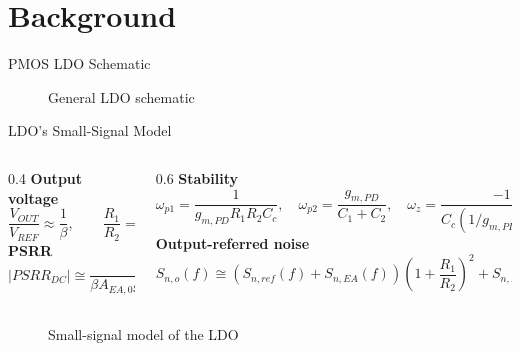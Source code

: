 \documentclass[10pt, aspectratio=169]{beamer}
\newcommand{\svg}[3]{
    \begin{figure}
        \centering
        
        \caption{#2}
    \end{figure}
}
\begin{document}
\section{Background}
\begin{frame}{PMOS LDO Schematic}
    \svg{../images/pmos_ldo.svg}{General LDO schematic}{1}
\end{frame}
\begin{frame}{LDO's Small-Signal Model}
    \begin{columns}[T,onlytextwidth]
        \begin{column}{0.4\textwidth}
            \small
            \textbf{Output voltage}
            \begin{equation*}
                \frac{V_{OUT}}{V_{REF}} \approx \frac{1}{\beta},
                \qquad
                \frac{R_1}{R_2} = \frac{V_{REF}}{V_{OUT}} - 1
            \end{equation*}
            \textbf{PSRR}
            \begin{equation*}
                |PSRR_{DC}| \cong
                \frac{1}{\beta A_{EA,0}g_{m,PD}r_{ds,p}}
            \end{equation*}
        \end{column}
        \begin{column}{0.6\textwidth}
            \small
            \textbf{Stability}
            \begin{equation*}
                \omega_{p1}=\frac{1}{g_{m,PD}R_1R_2C_c},
                \quad
                \omega_{p2}=\frac{g_{m,PD}}{C_1+C_2},
                \quad
                \omega_{z}=\frac{-1}{C_c(1 \slash g_{m,PD}-R_c)}
            \end{equation*}
            \textbf{Output-referred noise}
            \begin{equation*}
                S_{n,o}(f) \cong (S_{n,ref}(f)+S_{n,EA}(f))(1+\frac{R_1}{R_2})^2
                +S_{n,R2}(f)(\frac{R_1}{R_2})^2+S_{n,R_1}(f)
            \end{equation*}
        \end{column}
    \end{columns}
    \vspace{-0.3em}
    \begin{figure}
        \centering
        
        \caption{Small-signal model of the LDO}
    \end{figure}
\end{frame}
\end{document}
